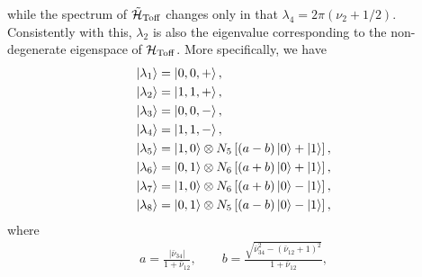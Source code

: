 while the spectrum of $\tilde{{\mathcal{H}}}_{\operatorname{Toff}}$ changes only in that
$\lambda_4 = 2\pi(\nu_2 + 1/2)$.
Consistently with this, $\lambda_2$ is also the eigenvalue corresponding to the non-degenerate eigenspace of ${\mathcal{H}}_{\operatorname{Toff}}$.
More specifically, we have
\begin{equation}
\begin{aligned}
	\ket{\lambda_1} &= \ket{0, 0, +}, \\
	\ket{\lambda_2} &= \ket{1, 1, +}, \\
	\ket{\lambda_3} &= \ket{0, 0, -}, \\
	\ket{\lambda_4} &= \ket{1, 1, -}, \\
	\ket{\lambda_5} &= \ket{1, 0} \otimes N_5\left[(a - b) \ket0 + \ket1 \right], \\
	\ket{\lambda_6} &= \ket{0, 1} \otimes N_6\left[(a + b) \ket0 + \ket1 \right], \\
	\ket{\lambda_7} &= \ket{1, 0} \otimes N_6\left[(a + b) \ket0 - \ket1 \right], \\
	\ket{\lambda_8} &= \ket{0, 1} \otimes N_5\left[(a - b) \ket0 - \ket1 \right],
\end{aligned}
\label{eq:GL:toffoli_eigenvectors_solution}
\end{equation}
where
\begin{equation}
\newcommand{\denom}{1 + \bar\nu_{12}}
\begin{gathered}
	a = \frac{\lvert\bar\nu_{34}\rvert}{\denom{}},
	\qquad
	b = \frac{\sqrt{\bar\nu_{34}^2 - (\bar\nu_{12} + 1)^2}}{\denom{}},
\end{gathered}
\end{equation}
